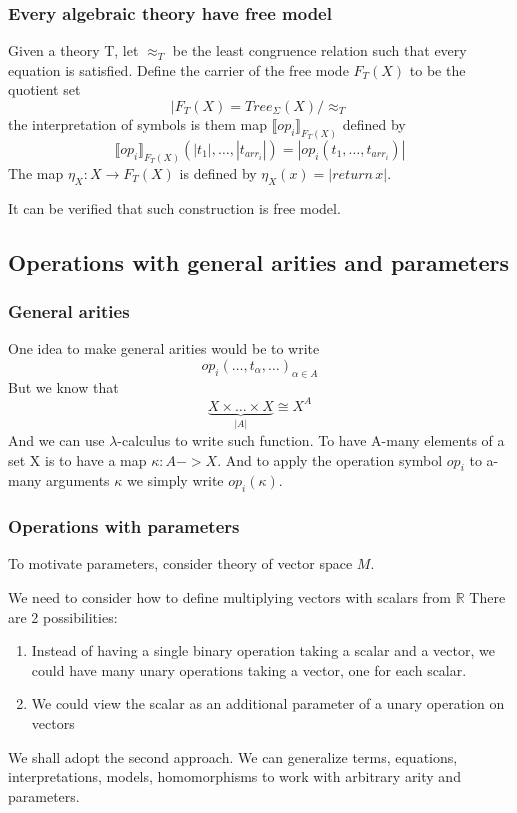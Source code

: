 \documentclass{beamer}
\begin{document}
\begin{frame}
    \frametitle{Every algebraic theory have free model}
    Given a theory T, let $\approx_T$ be the least congruence relation 
    such that every equation is satisfied.
    Define the carrier of the free mode $F_T(X)$ to be the quotient set
    \[
      |F_T(X) =   Tree_\Sigma(X)/\approx_T
    \] the interpretation of symbols is them map $\llbracket op_i \rrbracket_{F_T(X)}$ defined by
    \[
        \llbracket op_i \rrbracket_{F_T(X)}(|t_1|, \ldots, |t_{arr_i}|) =
        |op_i(t_1, \ldots, t_{arr_i})|   
    \]
    The map $\eta_X : X  \rightarrow  F_T(X)$ is defined by $\eta_X(x) = |return \, x|$.

    It can be verified that such construction is free model.
\end{frame}


    \subsection{Operations with general arities and parameters}
    \begin{frame}
        \frametitle{General arities}
        One idea to make general arities would be to write 
    \[
      op_i(\ldots, t_\alpha, \ldots)_{\alpha \in A}  
    \]
    But we know that 
    \[
      \underbrace{X \times  \ldots \times X}_{|A|} \cong X^A 
    \]
    And we can use $\lambda$-calculus to write such function.
    To have A-many elements of a set X is to have a map $\kappa : A -> X$.
    And to apply the operation symbol $op_i$ to a-many arguments $\kappa$ we simply write $op_i(\kappa)$.

    \end{frame}

    \begin{frame}
        \frametitle{Operations with parameters}
        To motivate parameters, consider theory of vector space $M$.

        We need to consider how to define multiplying vectors with scalars from $\mathbb{R}$
       There are 2 possibilities:
       \begin{enumerate}
        \item Instead of having a single binary operation taking a scalar and a vector, we could
        have many unary operations taking a vector, one for each scalar.
        \item We could view the scalar as an additional parameter of a unary operation on vectors
       \end{enumerate} 
       We shall adopt the second approach. We can generalize terms, equations, interpretations, 
       models, homomorphisms to work with arbitrary arity and parameters. 
    \end{frame}
\end{document}
